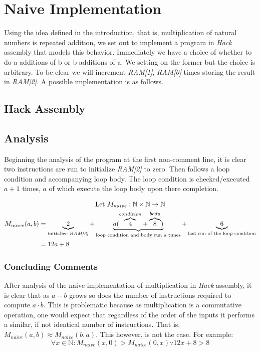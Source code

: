 \documentclass[a4paper,10pt,fleqn]{article}
\begin{document}
\section{Naive Implementation}
\label{naive_section}
Using the idea defined in the introduction, that is, multiplication of natural numbers is
repeated addition, we set out to implement a program in \emph{Hack} assembly that models this
behavior. Immediately we have a choice of whether to do a additions of b or b additions of a.
We setting on the former but the choice is arbitrary. To be clear we will increment
\emph{RAM[1]}, \emph{RAM[0]} times storing the result in \emph{RAM[2]}. A possible
implementation is as follows.

\subsection{Hack Assembly}


\subsection{Analysis}
\label{naive_analysis}
Beginning the analysis of the program at the first non-comment line, it is clear two
instructions are run to initialize \emph{RAM[2]} to zero. Then follows a loop condition and
accompanying loop body. The loop condition is checked/executed $a + 1$ times, $a$ of which
execute the loop body upon there completion.
\newline

\begin{gather*}
  \text{Let } M_{naive} : \mathbb{N} \times \mathbb{N} \to \mathbb{N} \\
  \begin{split}
    M_{naive}(a,b) & = \underbrace{2}_{\text{initialize \emph{RAM[2]}}}  + \underbrace{a(\overbrace{4}^{condition} + \overbrace{8}^{body})}_{\text{loop condition and body run $a$ times}}+ \underbrace{6}_{\text{last run of the loop condition}} \\
    & = 12a + 8
  \end{split}
\end{gather*}

\subsubsection{Concluding Comments}
After analysis of the naive implementation of multiplication in \emph{Hack} assembly, it is
clear that as $a - b$ grows so does the number of instructions required to compute $a \cdot b$.
This is problematic because as multiplication is a commutative operation, one would expect that regardless of the order of the inputs it performs a similar, if not identical number of instructions. That is, $M_{naive}(a,b) \approx M_{naive}(b,a)$. This however, is not the case. For example:
\begin{equation*}
\forall x \in \mathbb{N} : M_{naive}(x,0) > M_{naive}(0,x) \because 12x + 8 > 8
\end{equation*}
\end{document}
